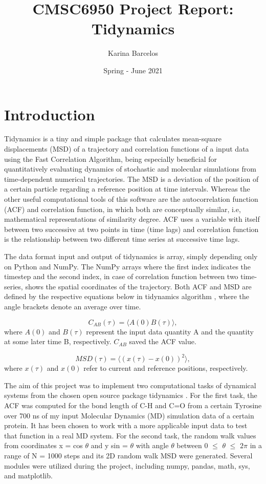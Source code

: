 \documentclass{article}
\title{CMSC6950 Project Report: Tidynamics}
\author{Karina Barcelos}
\date{Spring - June 2021}
\begin{document}
\maketitle

\section{Introduction}

Tidynamics \cite{Buyl2018} is a tiny and simple package that calculates mean-square displacements (MSD) of a trajectory and correlation functions of a input data using the Fast Correlation Algorithm, being \cite{kneller1995nmoldyn} especially beneficial for quantitatively evaluating dynamics of stochastic and molecular simulations from time-dependent numerical trajectories. The MSD is a deviation of the position of a certain particle regarding a reference position at time intervals. Whereas the other useful computational tools of this software are the autocorrelation function (ACF) and correlation function, in which both are conceptually similar, i.e, mathematical representations of similarity degree. ACF uses a variable with itself between two successive at two points in time (time lags) and correlation function is the relationship between two different time series at successive time lags.
 
The data format input and output of tidynamics \cite{Buyl2018} is array, simply depending only on Python and NumPy. The NumPy arrays where the first index indicates the timestep and the second index, in case of correlation function between two time-series, shows the spatial coordinates of the trajectory. Both ACF and MSD are defined by the respective equations below in tidynamics algorithm \cite{Buyl2018}, where the angle brackets denote an average over time. \cite{kneller1995nmoldyn}

\begin{equation}
C_{AB}(\tau) = \langle A(0) B(\tau) \rangle,
\label{eqn:correlation}
\end{equation}
where  $A(0)$ and $B(\tau)$ represent the input data quantity A and the quantity at some later time B, respectively. $C_{AB}$ saved the ACF value.

\begin{equation}
MSD(\tau) = \langle (x(\tau) - x(0) )^2 \rangle,
\label{eqn:msd}
\end{equation}
where $x(\tau)$ and $x(0)$ refer to current and reference positions, respectively.

The aim of this project was to implement two computational tasks of dynamical systems from the chosen open source package tidynamics \cite{Buyl2018}. For the first task, the ACF was computed for the bond length of C-H and C=O from a certain Tyrosine over 700 ns of my input Molecular Dynamics (MD) simulation data of a certain protein. It has been chosen to work with a more applicable input data to test that function in a real MD system. For the second task, the random walk values from coordinates x = cos $\theta$ and y sin = $\theta$ with angle $\theta$ between 0 $\leq$ $\theta$ $\leq$ $2\pi$ in a range of N = 1000 steps and its 2D random walk MSD were generated. Several modules were utilized during the project, including numpy, pandas, math, sys, and matplotlib.
\end{document}
